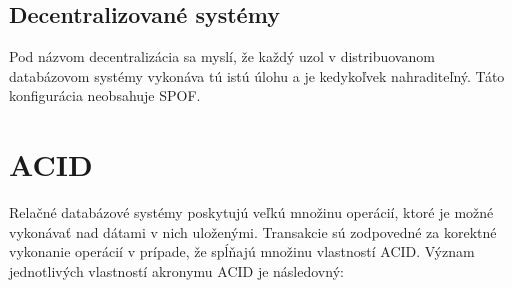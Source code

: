 \documentclass[11pt,twoside,a4paper]{book}
\begin{document}
\subsection*{Decentralizované systémy}

Pod názvom decentralizácia sa myslí, že každý uzol v distribuovanom databázovom systémy vykonáva tú istú úlohu a je kedykoľvek nahraditeľný. Táto konfigurácia neobsahuje SPOF.


\section{ACID}

Relačné databázové systémy poskytujú veľkú množinu operácií, ktoré je možné vykonávať nad dátami v nich uloženými. Transakcie \cite{gray1981transaction, haerder1983principles} sú zodpovedné za korektné vykonanie operácií v prípade, že spĺňajú množinu vlastností ACID. Význam jednotlivých vlastností akronymu ACID je následovný:
\end{document}
